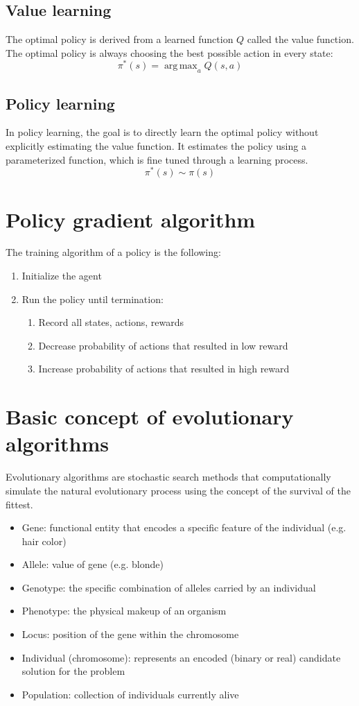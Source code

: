 \documentclass[a4paper,12pt,answers]{article}
\DeclareMathOperator*{\argmax}{arg\,max}
\begin{document}
	\subsection{Value learning}
	The optimal policy is derived from a learned function $Q$ called the value function. The optimal policy is always choosing the best possible action in every state:
	\[
	\pi^*(s) = \argmax_{a}{Q(s,a)}
	\]
	
	\subsection{Policy learning}
	In policy learning, the goal is to directly learn the optimal policy without explicitly estimating the value function. It estimates the policy using a parameterized function, which is fine tuned through a learning process.
	\[
	\pi^*(s) \sim \pi(s)
	\]
	
	
	
	\section{Policy gradient algorithm}
	The training algorithm of a policy is the following:
	\begin{enumerate}
		\item Initialize the agent
		\item Run the policy until termination:
		\begin{enumerate}
			\item Record all states, actions, rewards
			\item Decrease probability of actions that resulted in low reward
			\item Increase probability of actions that resulted in high reward
		\end{enumerate}
	\end{enumerate}
	
	
	
	\newpage
	\section{Basic concept of evolutionary algorithms}
	Evolutionary algorithms are stochastic search methods that computationally simulate the natural evolutionary process using the concept of the survival of the fittest.
	\begin{itemize}
		\item Gene: functional entity that encodes a specific feature of the individual (e.g. hair color)
		\item Allele: value of gene (e.g. blonde)
		\item Genotype: the specific combination of alleles carried by an individual
		\item Phenotype: the physical makeup of an organism
		\item Locus: position of the gene within the chromosome
		\item Individual (chromosome): represents an encoded (binary or real) candidate solution for the problem
		\item Population: collection of individuals currently alive
	\end{itemize}
	
\end{document}

